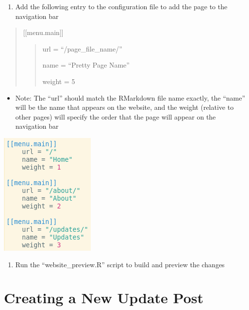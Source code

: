 \documentclass[
]{book}
\providecommand{\tightlist}{%
  \setlength{\itemsep}{0pt}\setlength{\parskip}{0pt}}
\begin{document}
\begin{enumerate}
\def\labelenumi{\arabic{enumi}.}
\setcounter{enumi}{4}
\tightlist
\item
  Add the following entry to the configuration file to add the page to the navigation bar
\end{enumerate}

\begin{quote}
{[}{[}menu.main{]}{]}

\begin{quote}
url = ``/page\_file\_name/''

name = ``Pretty Page Name''

weight = 5
\end{quote}
\end{quote}

\begin{itemize}
\tightlist
\item
  Note: The ``url'' should match the RMarkdown file name exactly, the ``name'' will be the name that appears on the website, and the weight (relative to other pages) will specify the order that the page will appear on the navigation bar
\end{itemize}

\includegraphics{images/04-newpage_5.png}

\begin{enumerate}
\def\labelenumi{\arabic{enumi}.}
\setcounter{enumi}{5}
\tightlist
\item
  Run the ``website\_preview.R'' script to build and preview the changes
\end{enumerate}

\hypertarget{creating-a-new-update-post}{%
\section{Creating a New Update Post}\label{creating-a-new-update-post}}
\end{document}
